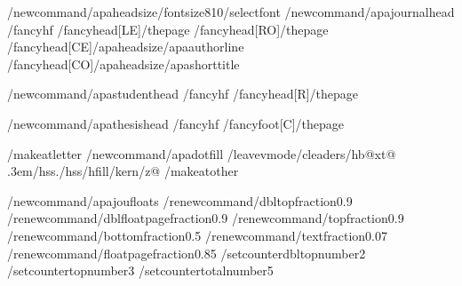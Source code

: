 %
/newcommand{/apaheadsize}{/fontsize{8}{10}/selectfont}
/newcommand{/apajournalhead}{%
  /fancyhf{}%
  /fancyhead[LE]{/thepage}%
  /fancyhead[RO]{/thepage}%
  /fancyhead[CE]{{/apaheadsize/apaauthorline}}%
  /fancyhead[CO]{{/apaheadsize/apashorttitle}}}

/newcommand{/apastudenthead}{%
  /fancyhf{}%
  /fancyhead[R]{/thepage}}

/newcommand{/apathesishead}{%
  /fancyhf{}%
  /fancyfoot[C]{/thepage}}

/makeatletter
/newcommand{/apadotfill}{%
  /leavevmode/cleaders/hb@xt@ .3em{/hss./hss}/hfill/kern/z@}
/makeatother

%
/newcommand{/apajoufloats}{%
  /renewcommand{/dbltopfraction}{0.9}%
  /renewcommand{/dblfloatpagefraction}{0.9}%
  /renewcommand{/topfraction}{0.9}%
  /renewcommand{/bottomfraction}{0.5}%
  /renewcommand{/textfraction}{0.07}%
  /renewcommand{/floatpagefraction}{0.85}%
  /setcounter{dbltopnumber}{2}%
  /setcounter{topnumber}{3}%
  /setcounter{totalnumber}{5}}

